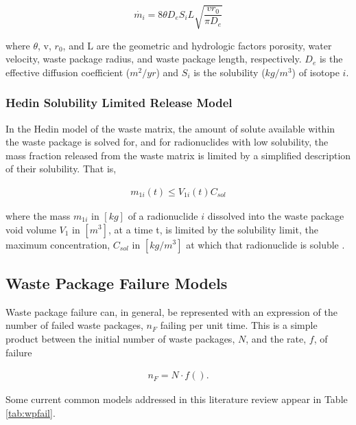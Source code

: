 \begin{equation}
 \dot{m_i}=8\theta D_eS_iL\sqrt{\frac{vr_0}{\pi D_e}}
\end{equation} 

where $\theta$, v, $r_0$, and L are the geometric and
hydrologic factors porosity, water velocity, waste package radius, and waste
package length, respectively. $D_e$ is the effective diffusion coefficient
($m^2/yr$)  and $S_i$ is the solubility ($kg/m^3$) of isotope $i$.


\subsubsection{Hedin Solubility Limited Release Model}

In the Hedin model of the waste matrix, the amount of solute available within
the waste package is solved for, and for radionuclides with low solubility, the mass
fraction released from the waste matrix is limited by a simplified description
of their solubility. That is, 

\begin{align} 
  m_{1i}(t)\le V_{1i}(t)C_{sol}
\end{align}

where the mass $m_{1i}$ in $[kg]$ of a radionuclide $i$ dissolved into the waste package
void volume $V_1$ in $[m^3]$, at a time t, is limited by the solubility limit, 
the maximum concentration, $C_{sol}$ in $[kg/m^3]$ at which that radionuclide is 
soluble \cite{hedin_integrated_2002}.


\subsection{Waste Package Failure Models}

Waste package failure can, in general, be represented with an expression of the 
number of failed waste packages, $n_F$ failing per unit time. This is a simple 
product between the initial number of waste packages, $N$, and the rate, $f$, of 
failure

\begin{align}
  n_F = N\cdot f().
  \label{rate}
\end{align}

Some current common models addressed in this literature review appear in Table 
\ref{tab:wpfail}.




